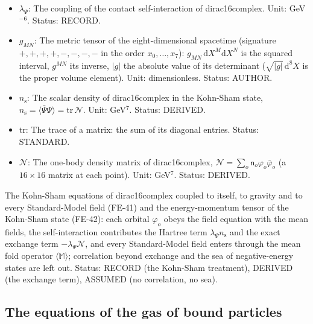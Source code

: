 \documentclass[
  10pt,
]{article}
\begin{document}
\begin{itemize}
  \(D_M = \partial_M + \Omega_M\) (with
  \(D_M\bar\Psi = \partial_M\bar\Psi - \bar\Psi\Omega_M\)); on the
  fields of the fold the gauge and spin covariant derivative \(D_\mu\)
  (the partial derivative plus the spin connection of the fold and the
  gauge fields times their couplings and generators);
  \(D^\mu = \hat h^{\mu\nu}D_\nu\); on an adjoint field
  \((D_\mu X)^A = \partial_\mu X^A + g_3f^{ABC}G^B_\mu X^C\) (likewise
  for \(SU(2)\) with \(g_2\epsilon^{IJK}\)). Unit: 1/length. Status:
  STANDARD.
\item
  \(\lambda_\Psi\): The coupling of the contact self-interaction of
  dirac16complex. Unit: GeV\(^{-6}\). Status: RECORD.
\item
  \(g_{MN}\): The metric tensor of the eight-dimensional spacetime
  (signature \(+,+,+,+,-,-,-,-\) in the order \(x_0, \dots, x_7\)):
  \(g_{MN}\,\mathrm{d}X^M\mathrm{d}X^N\) is the squared interval,
  \(g^{MN}\) its inverse, \(\lvert g\rvert\) the absolute value of its
  determinant (\(\sqrt{\lvert g\rvert}\,\mathrm{d}^8X\) is the proper
  volume element). Unit: dimensionless. Status: AUTHOR.
\item
  \(n_{\mathrm{s}}\): The scalar density of dirac16complex in the
  Kohn-Sham state,
  \(n_{\mathrm{s}} = \langle\bar\Psi\Psi\rangle = \mathrm{tr}\,\mathcal{N}\).
  Unit: GeV\(^7\). Status: DERIVED.
\item
  \(\mathrm{tr}\): The trace of a matrix: the sum of its diagonal
  entries. Status: STANDARD.
\item
  \(\mathcal{N}\): The one-body density matrix of dirac16complex,
  \(\mathcal{N} = \sum_o\mathsf{n}_o\varphi_o\bar\varphi_o\) (a
  \(16 \times 16\) matrix at each point). Unit: GeV\(^7\). Status:
  DERIVED.
\end{itemize}

The Kohn-Sham equations of dirac16complex coupled to itself, to gravity
and to every Standard-Model field (FE-41) and the energy-momentum tensor
of the Kohn-Sham state (FE-42): each orbital \(\varphi_o\) obeys the
field equation with the mean fields, the self-interaction contributes
the Hartree term \(\lambda_\Psi n_{\mathrm{s}}\) and the exact exchange
term \(-\lambda_\Psi\mathcal{N}\), and every Standard-Model field enters
through the mean fold operator \(\langle\mathbb{M}\rangle\); correlation
beyond exchange and the sea of negative-energy states are left out.
Status: RECORD (the Kohn-Sham treatment), DERIVED (the exchange term),
ASSUMED (no correlation, no sea).

\hypertarget{the-equations-of-the-gas-of-bound-particles}{%
\subsection{The equations of the gas of bound
particles}\label{the-equations-of-the-gas-of-bound-particles}}
\end{document}
